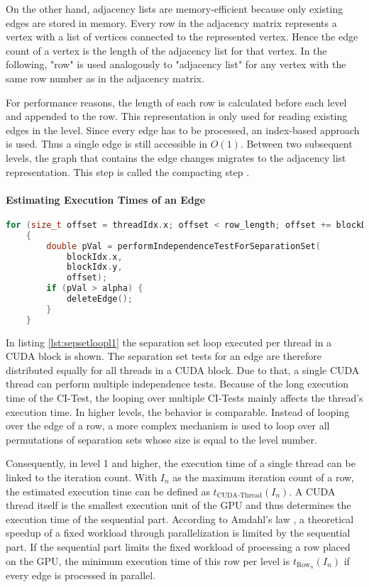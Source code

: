 On the other hand, adjacency lists are memory-efficient because only existing edges are stored in memory. Every row in the adjacency matrix represents a vertex with a list of vertices connected to the represented vertex. Hence the edge count of a vertex is the length of the adjacency list for that vertex. In the following, "row" is used analogously to "adjacency list" for any vertex with the same row number as in the adjacency matrix.

For performance reasons, the length of each row is calculated before each level and appended to the row. This representation is only used for reading existing edges in the level. Since every edge has to be processed, an index-based approach is used. Thus a single edge is still accessible in $O(1)$.
Between two subsequent levels, the graph that contains the edge changes migrates to the adjacency list representation. This step is called the compacting step \cite{zarebavaniCuPCCUDAbasedParallel2018}.

\paragraph{Estimating Execution Times of an Edge}

\begin{lstlisting}[language=C++, caption=Separation set loop in level 1, label=lst:sepsetloopl1]
    for (size_t offset = threadIdx.x; offset < row_length; offset += blockDim.x)
    {
        double pVal = performIndependenceTestForSeparationSet(
            blockIdx.x,
            blockIdx.y,
            offset);
        if (pVal > alpha) {
            deleteEdge();
        }
    }
\end{lstlisting}

In listing \ref{lst:sepsetloopl1} the separation set loop executed per thread in a CUDA block is shown. The separation set tests for an edge are therefore distributed equally for all threads in a CUDA block. Due to that, a single CUDA thread can perform multiple independence tests. Because of the long execution time of the CI-Test, the looping over multiple CI-Tests mainly affects the thread's execution time. In higher levels, the behavior is comparable. Instead of looping over the edge of a row, a more complex mechanism is used to loop over all permutations of separation sets whose size is equal to the level number.

Consequently, in level 1 and higher, the execution time of a single thread can be linked to the iteration count. With $I_n$ as the maximum iteration count of a row, the estimated execution time can be defined as $t_{\text{CUDA-Thread}}(I_n)$. A CUDA thread itself is the smallest execution unit of the GPU and thus determines the execution time of the sequential part. According to Amdahl's law \cite{amdahlValiditySingleProcessor1967}, a theoretical speedup of a fixed workload through parallelization is limited by the sequential part. If the sequential part limits the fixed workload of processing a row placed on the GPU, the minimum execution time of this row per level is $t_{\text{Row}_n}(I_n)$ if every edge is processed in parallel.

